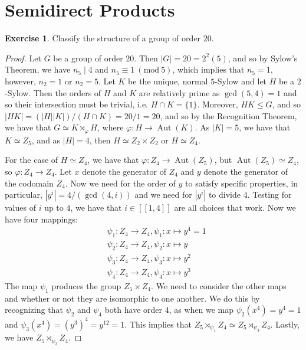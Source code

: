 \documentclass[9pt,reqno]{amsart}
\theoremstyle{definition}
\newtheorem{exercise}{Exercise}[section]
\DeclareMathOperator{\aut}{Aut}
\newcommand{\Mod}[1]{\ (\mathrm{mod}\ #1)}
\begin{document}
\section{Semidirect Products}
\begin{exercise}
	Classify the structure of a group of order $20$.
\end{exercise}
\begin{proof}
	Let $G$ be a group of order $20$. Then $|G| = 20 = 2^2 (5)$, and so by Sylow's Theorem, we have $n_5 \mid 4$ and $n_5 \equiv 1 \Mod{5}$, which implies that $n_5 = 1$, however, $n_2 = 1$ or $n_2 = 5$. Let $K$ be the unique, normal $5$-Sylow and let $H$ be a $2$-Sylow. Then the orders of $H$ and $K$ are relatively prime as $\gcd (5, 4) = 1$ and so their intersection must be trivial, i.e. $H \cap K = \{1 \}$. Moreover, $HK \leq G$, and so $|HK| = (|H| |K|)/ (H\cap K) = 20/ 1 = 20$, and so by the Recognition Theorem, we have that $G \simeq K \rtimes_\varphi H$, where $\varphi \colon H \to \aut (K)$. As $|K| =5$, we have that $K \simeq Z_5$, and as $|H| = 4$, then $H \simeq Z_2 \times Z_2 $ or $H \simeq Z_4$. 
	
	For the case of $H \simeq Z_4$, we have that $\varphi \colon Z_4 \to \aut (Z_5)$, but $\aut( Z_5) \simeq Z_4$, so $\varphi \colon Z_4 \to Z_4$. Let $x$ denote the generator of $Z_4$ and $y$ denote the generator of the codomain $Z_4$. Now we need for the order of $y$ to satisfy specific properties, in particular, $|y^i | = 4/ (\gcd (4, i))$ and we need for $|y^i|$ to divide $4$. Testing for values of $i$ up to $4$, we have that $i \in [[1, 4 ]]$ are all choices that work. Now we have four mappings:
	\begin{align*}
		& \psi_1 \colon Z_4 \to Z_4, \psi_1 \colon x \mapsto y^4 = 1 \\
		& \psi_2 \colon Z_4 \to Z_4, \psi_2 \colon x \mapsto y \\
		& \psi_3 \colon Z_4 \to Z_4, \psi_3 \colon x \mapsto y^2 \\ 
		& \psi_4 \colon Z_4 \to Z_4, \psi_4 \colon x \mapsto y^3 
	\end{align*} 
	The map $\psi_1$ produces the group $Z_5 \times Z_4$. We need to consider the other maps and whether or not they are isomorphic to one another. We do this by recognizing that $\psi_2 $ and $\psi_4$ both have order $4$, as when we map $\psi_2 (x^4) = y^4 = 1$ and $\psi_ 3 (x^4) = (y^3)^4 = y^{12} = 1$. This implies that $Z_5 \rtimes_{\psi_1} Z_4 \simeq Z_5 \rtimes_{\psi_3} Z_4$. Lastly, we have $Z_5 \rtimes_{\psi_3} Z_4$. 
	

\end{proof}
\end{document}
